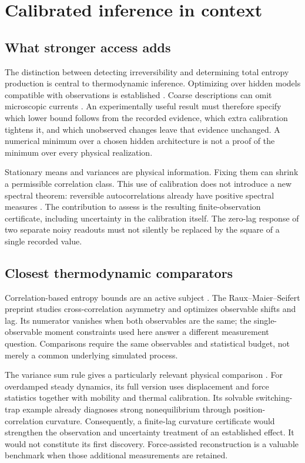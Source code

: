 \chapter{Calibrated inference in context}
\label{ch:ci-positioning}

\section{What stronger access adds}

The distinction between detecting irreversibility and determining total
entropy production is central to thermodynamic inference. Optimizing over
hidden models compatible with observations is established
\cite{ciEhrich2021,ciNitzan2023}. Coarse descriptions can omit microscopic
currents \cite{ciBusiello2019}. An experimentally useful result must therefore
specify which lower bound follows from the recorded evidence, which extra
calibration tightens it, and which unobserved changes leave that evidence
unchanged. A numerical minimum over a chosen hidden architecture is not a
proof of the minimum over every physical realization.

Stationary means and variances are physical information. Fixing them can shrink
a permissible correlation class. This use of calibration does not introduce
a new spectral theorem: reversible autocorrelations already have positive
spectral measures \cite{vlAldousFill2002}. The contribution to assess is the
resulting finite-observation certificate, including uncertainty in the
calibration itself. The zero-lag response of two separate noisy readouts
must not silently be replaced by the square of a single recorded value.

\section{Closest thermodynamic comparators}

Correlation-based entropy bounds are an active subject
\cite{rfShiraishi2023,rfDechant2023,rfRaux2026}. The Raux--Maier--Seifert
preprint studies cross-correlation asymmetry and optimizes observable shifts
and lag. Its numerator vanishes when both observables are the same; the
single-observable moment constraints used here answer a different measurement
question. Comparisons require the same observables and statistical budget,
not merely a common underlying simulated process.

The variance sum rule gives a particularly relevant physical comparison
\cite{ciVSR2024,ciVSRProofs2024}. For overdamped steady dynamics, its full
version uses displacement and force statistics together with mobility and
thermal calibration. Its solvable switching-trap example already diagnoses
strong nonequilibrium through position-correlation curvature. Consequently,
a finite-lag curvature certificate would strengthen the observation and
uncertainty treatment of an established effect. It would not constitute its
first discovery. Force-assisted reconstruction is a valuable benchmark when
those additional measurements are retained.

